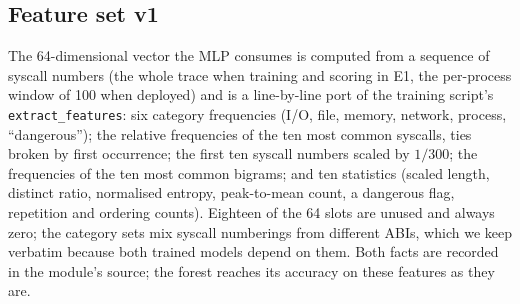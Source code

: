 \subsection{Feature set v1}
\label{sec:appendix:features}
The 64-dimensional vector the MLP consumes is computed from a sequence of
syscall numbers (the whole trace when training and scoring in E1, the
per-process window of 100 when deployed) and is a line-by-line port of the
training script's \texttt{extract\_features}: six category frequencies
(I/O, file, memory, network, process, ``dangerous''); the relative
frequencies of the ten most common syscalls, ties broken by first
occurrence; the first ten syscall numbers scaled by $1/300$; the
frequencies of the ten most common bigrams; and ten statistics (scaled
length, distinct ratio, normalised entropy, peak-to-mean count, a dangerous
flag, repetition and ordering counts). Eighteen of the 64 slots are unused
and always zero; the category sets mix syscall numberings from different
ABIs, which we keep verbatim because both trained models depend on them.
Both facts are recorded in the module's source; the forest reaches its
accuracy on these features as they are.

